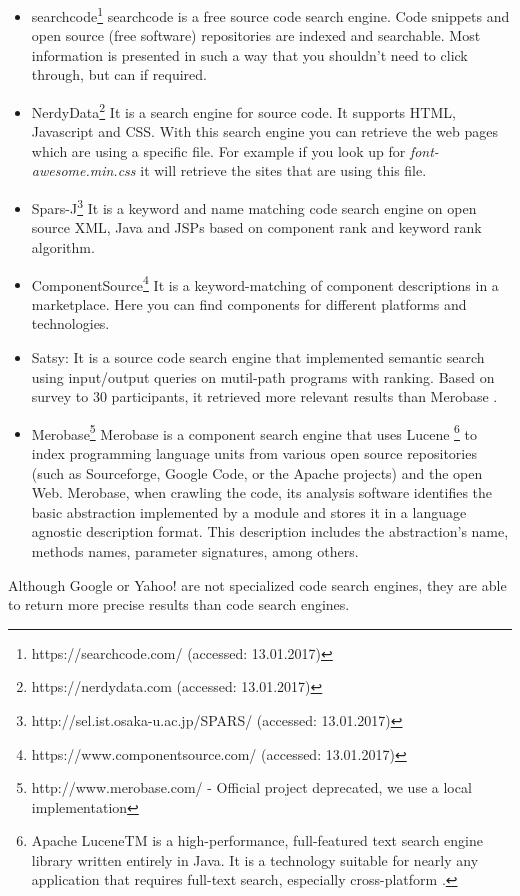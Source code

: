 \begin{itemize}
\item searchcode\footnote{https://searchcode.com/ (accessed: 13.01.2017)} searchcode is a free source code search engine. Code snippets and open source (free software) repositories are indexed and searchable. Most information is presented in such a way that you shouldn't need to click through, but can if required.
\item NerdyData\footnote{https://nerdydata.com (accessed: 13.01.2017)} It is a search engine for source code. It supports HTML, Javascript and CSS. With this search engine you can retrieve the web pages which are using a specific file. For example if you look up for \textit{font-awesome.min.css} it will retrieve the sites that are using this file.
\item Spars-J\footnote{http://sel.ist.osaka-u.ac.jp/SPARS/ (accessed: 13.01.2017)} It is a keyword and name matching code search engine on open source XML, Java and JSPs based on component rank and keyword rank algorithm.
\item ComponentSource\footnote{https://www.componentsource.com/ (accessed: 13.01.2017)} It is a keyword-matching of component descriptions in a marketplace. Here you can find components for different platforms and technologies.
\item Satsy: It is a source code search engine that implemented semantic search using input/output queries on mutil-path programs with ranking. Based on survey to 30 participants, it retrieved more relevant results than Merobase \citep{Stolee2016}.
\item Merobase\footnote{http://www.merobase.com/ - Official project deprecated, we use a local implementation} Merobase is a component search engine that uses Lucene \footnote{Apache LuceneTM is a high-performance, full-featured text search engine library written entirely in Java. It is a technology suitable for nearly any application that requires full-text search, especially cross-platform \citep{lucene}.} to index programming language units from various open source repositories (such as Sourceforge, Google Code, or the Apache projects) and the open Web. Merobase, when crawling the code, its analysis software identifies the basic abstraction implemented by a module and stores it in a language agnostic description format. This description includes the abstraction's name, methods names, parameter signatures, among others.
\end{itemize}

Although Google or Yahoo! are not specialized code search engines, they are able to return more precise results than code search engines\citep{Hummel2007}.


